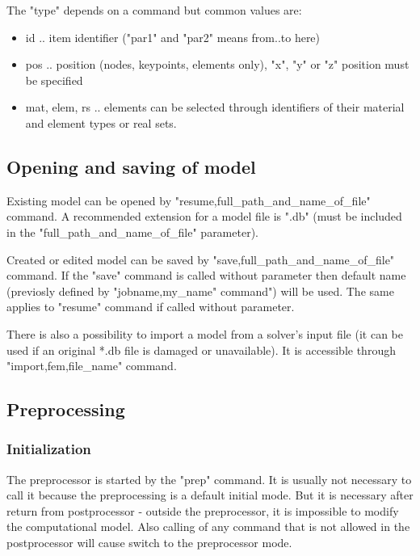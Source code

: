 \documentclass{article}
\begin{document}
 The "type" depends on a command but common values are:


\begin{itemize}
\item  id .. item identifier ("par1" and "par2" means from..to here)
\item  pos .. position (nodes, keypoints, elements only), "x", "y" or "z" position must be specified
\item  mat, elem, rs .. elements can be selected through identifiers of their material and element types or real sets.
\end{itemize}

\subsection{Opening and saving of model}

 Existing model can be opened by
 "resume,full\_path\_and\_name\_of\_file" command. A recommended
 extension for a model file is ".db" (must be included in the
 "full\_path\_and\_name\_of\_file" parameter).

 Created or edited model can be saved by
 "save,full\_path\_and\_name\_of\_file" command. If the "save" command
 is called without parameter then default name (previosly defined
 by "jobname,my\_name" command") will be used. The same applies to
 "resume" command if called without parameter.

 There is also a possibility to import a model from a solver's input
 file (it can be used if an original *.db file is damaged or
 unavailable). It is accessible through "import,fem,file\_name"
 command.



\subsection{Preprocessing}

\subsubsection{Initialization}

 The preprocessor is started by the "prep" command. It is
 usually not necessary to call it because the preprocessing
 is a default initial mode. But it is necessary after return
 from postprocessor - outside the preprocessor, it is impossible
 to modify the computational model. Also calling of any
 command that is not allowed in the postprocessor will
 cause switch to the preprocessor mode.
\end{document}

